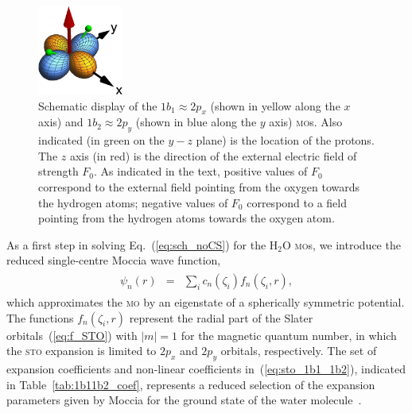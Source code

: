 \begin{figure}
  \centering
  \includegraphics[width=0.25\textwidth]{figures/ch_H2O/1b1_1b2/orbitals.eps}
  \caption{Schematic display of the $1b_{1}\approx 2p_{x}$ (shown in
    yellow along the $x$ axis) and $1b_{2}\approx 2p_{y}$ (shown in
    blue along the $y$ axis) \textsc{mo}s. Also indicated (in green on
    the $y-z$ plane) is the location of the protons. The $z$ axis (in
    red) is the direction of the external electric field of strength
    $F_{0}$. As indicated in the text, positive values of $F_{0}$
    correspond to the external field pointing from the oxygen towards
    the hydrogen atoms; negative values of $F_{0}$ correspond to a
    field pointing from the hydrogen atoms towards the oxygen atom.}
  \label{fig:h2o_1b1_1b2}
\end{figure}

As a first step in solving Eq.~(\ref{eq:sch_noCS}) for the H$_{2}$O
\textsc{mo}s, we introduce the reduced single-centre Moccia wave
function,
%
\begin{eqnarray}
  \begin{split}
    \psi_{n}(r) & = & \sum\limits_{i}
    c_{n}(\zeta_{i}) f_{n}(\zeta_{i}, r),
    \label{eq:sto_1b1_1b2}
  \end{split}
\end{eqnarray}
%
which approximates the \textsc{mo} by an eigenstate of a spherically
symmetric potential. The functions $f_{n}(\zeta_{i},r)$ represent the
radial part of the Slater orbitals~(\ref{eq:f_STO}) with $|m|=1$ for
the magnetic quantum number, in which the \textsc{sto} expansion is
limited to $2p_{x}$ and $2p_{y}$ orbitals, respectively. The set of
expansion coefficients and non-linear coefficients
in~(\ref{eq:sto_1b1_1b2}), indicated in Table~\ref{tab:1b11b2_coef},
represents a reduced selection of the expansion parameters given by
Moccia for the ground state of the water molecule~\cite{Moccia_1964}.

